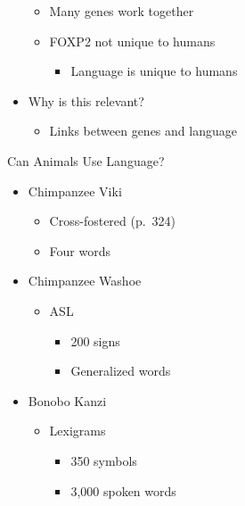 \documentclass[
]{book}
\providecommand{\tightlist}{%
  \setlength{\itemsep}{0pt}\setlength{\parskip}{0pt}}
\begin{document}
\begin{reflect}
\begin{itemize}
  \begin{itemize}
  \tightlist
  \item
    Many genes work together\\
  \item
    FOXP2 not unique to humans

    \begin{itemize}
    \tightlist
    \item
      Language is unique to humans
    \end{itemize}
  \end{itemize}
\item
  Why is this relevant?

  \begin{itemize}
  \tightlist
  \item
    Links between genes and language
  \end{itemize}
\end{itemize}

Can Animals Use Language?

\begin{itemize}
\tightlist
\item
  Chimpanzee Viki

  \begin{itemize}
  \tightlist
  \item
    Cross-fostered (p.~324)\\
  \item
    Four words
  \end{itemize}
\item
  Chimpanzee Washoe

  \begin{itemize}
  \tightlist
  \item
    ASL

    \begin{itemize}
    \tightlist
    \item
      200 signs\\
    \item
      Generalized words
    \end{itemize}
  \end{itemize}
\item
  Bonobo Kanzi

  \begin{itemize}
  \tightlist
  \item
    Lexigrams

    \begin{itemize}
    \tightlist
    \item
      350 symbols\\
    \item
      3,000 spoken words
    \end{itemize}
  \end{itemize}
\end{itemize}


\end{reflect}
\end{document}
